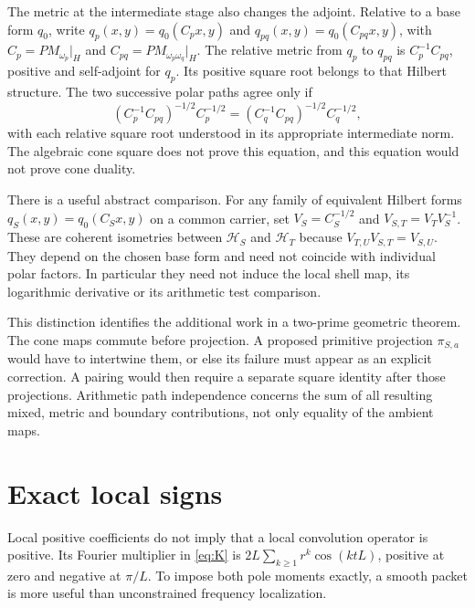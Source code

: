 \documentclass[11pt,letterpaper]{article}
\theoremstyle{definition}
\theoremstyle{remark}
\begin{document}
The metric at the intermediate stage also changes the adjoint.
Relative to a base form $q_0$, write
$q_p(x,y)=q_0(C_px,y)$ and
$q_{pq}(x,y)=q_0(C_{pq}x,y)$, with
$C_p=PM_{\omega_p}|_H$ and $C_{pq}=PM_{\omega_p\omega_q}|_H$.
The relative metric from $q_p$ to $q_{pq}$ is
$C_p^{-1}C_{pq}$, positive and self-adjoint for $q_p$.
Its positive square root belongs to that Hilbert structure.
The two successive polar paths agree only if
\begin{equation}
 (C_p^{-1}C_{pq})^{-1/2}C_p^{-1/2}
 =(C_q^{-1}C_{pq})^{-1/2}C_q^{-1/2},
 \label{eq:polar-square}
\end{equation}
with each relative square root understood in its appropriate
intermediate norm. The algebraic cone square does not prove
this equation, and this equation would not prove cone duality.

There is a useful abstract comparison. For any family of equivalent
Hilbert forms $q_S(x,y)=q_0(C_Sx,y)$ on a common carrier, set
$V_S=C_S^{-1/2}$ and $V_{S,T}=V_TV_S^{-1}$. These are coherent
isometries between $\mathcal H_S$ and $\mathcal H_T$ because
$V_{T,U}V_{S,T}=V_{S,U}$. They depend on the chosen base form
and need not coincide with individual polar factors. In
particular they need not induce the local shell map, its
logarithmic derivative or its arithmetic test comparison.

This distinction identifies the additional work in a two-prime
geometric theorem. The cone maps commute before projection.
A proposed primitive projection $\pi_{S,a}$ would have to intertwine
them, or else its failure must appear as an explicit correction.
A pairing would then require a separate square identity after
those projections. Arithmetic path independence concerns the
sum of all resulting mixed, metric and boundary contributions,
not only equality of the ambient maps.

\section{Exact local signs}

Local positive coefficients do not imply that a local convolution
operator is positive. Its Fourier multiplier in \eqref{eq:K} is
$2L\sum_{k\ge1}r^k\cos(ktL)$, positive at zero and negative at
$\pi/L$. To impose both pole moments exactly, a smooth packet is
more useful than unconstrained frequency localization.
\end{document}
